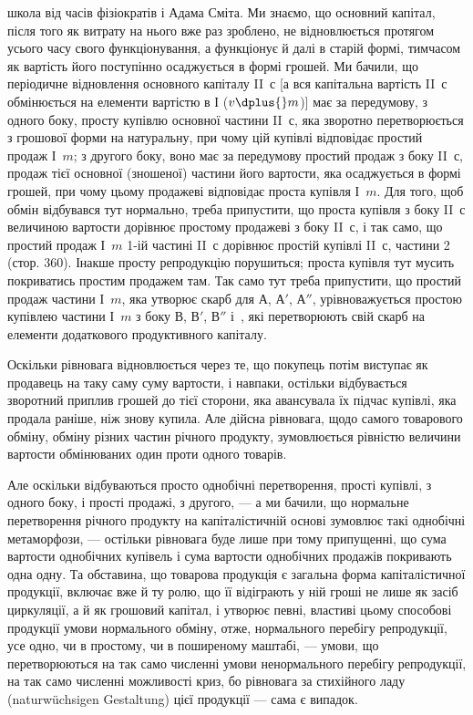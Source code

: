\parcont{}  %
школа від часів фізіократів і Адама Сміта. Ми знаємо, що основний
капітал, після того як витрату на нього вже раз зроблено, не відновлюється
протягом усього часу свого функціонування, а функціонує й
далі в старій формі, тимчасом як вартість його поступінно осаджується
в формі грошей. Ми бачили, що періодичне відновлення основного капіталу
II~$с$ [а вся капітальна вартість II~$с$ обмінюється на елементи вартістю
в І ($v \dplus{} m$)] має за передумову, з одного боку, просту купівлю
основної частини II~$с$, яка зворотно перетворюється з грошової форми
на натуральну, при чому цій купівлі відповідає простий продаж І~$m$;
з другого боку, воно має за передумову простий продаж з боку
II~$с$, продаж тієї основної (зношеної) частини його вартости, яка осаджується
в формі грошей, при чому цьому продажеві відповідає проста
купівля І~$m$. Для того, щоб обмін відбувався тут нормально, треба припустити,
що проста купівля з боку II~$с$ величиною вартости дорівнює
простому продажеві з боку II~$с$, і так само, що простий продаж І~$m$
1-ій частині II~$с$ дорівнює простій купівлі II~$с$, частини 2 (стор. 360).
Інакше просту репродукцію порушиться; проста купівля тут мусить
покриватись простим продажем там. Так само тут треба припустити,
що простий продаж частини І~$m$, яка утворює скарб для $А$, $А'$, $А''$,
урівноважується простою купівлею частини І~$m$ з боку $В$, $В'$, $В''$
і~, які перетворюють свій скарб на елементи додаткового продуктивного
капіталу.

Оскільки рівновага відновлюється через те, що покупець потім виступає
як продавець на таку саму суму вартости, і навпаки, остільки відбувається
зворотний приплив грошей до тієї сторони, яка авансувала їх
підчас купівлі, яка продала раніше, ніж знову купила. Але дійсна рівновага,
щодо самого товарового обміну, обміну різних частин річного продукту,
зумовлюється рівністю величини вартости обмінюваних один проти
одного товарів.

Але оскільки відбуваються просто однобічні перетворення, прості
купівлі, з одного боку, і прості продажі, з другого, — а ми бачили, що
нормальне перетворення річного продукту на капіталістичній основі зумовлює
такі однобічні метаморфози, — остільки рівновага буде лише при
тому припущенні, що сума вартости однобічних купівель і сума вартости
однобічних продажів покривають одна одну. Та обставина, що товарова
продукція є загальна форма капіталістичної продукції, включає вже й ту
ролю, що її відіграють у ній гроші не лише як засіб циркуляції, а й
як грошовий капітал, і утворює певні, властиві цьому способові продукції
умови нормального обміну, отже, нормального перебігу репродукції,
усе одно, чи в простому, чи в поширеному маштабі, — умови,
що перетворюються на так само численні умови ненормального перебігу
репродукції, на так само численні можливості криз, бо рівновага за стихійного
ладу (naturwüchsigen Gestaltung) цієї продукції — сама є випадок.

